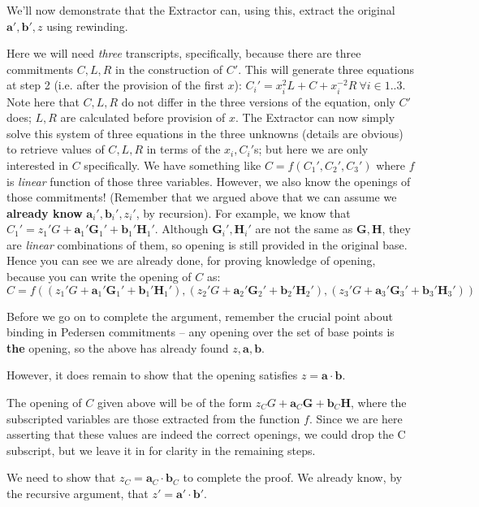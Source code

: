 \documentclass[10pt,a4paper]{article}
\begin{document}
We'll now demonstrate that the Extractor can, using this, extract the
original $\mathbf{a}', \mathbf{b}', z$ using rewinding.

Here we will need \emph{three} transcripts, specifically, because there
are three commitments $C, L, R$ in the construction of $C'$. This will generate three
equations at step 2 (i.e. after the provision of the first $x$):
$C_i' = x_i^2L + C + x_i^{-2}R\ \forall i \in 1..3$. Note here that $C, L, R$ do not differ in the three versions of the equation,
only $C'$ does; $L, R$ are calculated before provision of $x$. The Extractor can now
simply solve this system of three equations in the three unknowns
(details are obvious) to retrieve values of $C, L, R$ in terms of the $x_i,C_i'$s; but here
we are only interested in $C$ specifically. We have something like $C = f(C_1', C_2', C_3')$ where $f$ is
\emph{linear} function of those three variables. However, we also know
the openings of those commitments! (Remember that we argued above that
we can assume we \textbf{already know} $\textbf{a}_i', \textbf{b}_i', z_i'$, by recursion). For example, we
know that $C_1' = z_1'G + \textbf{a}_1'\textbf{G}_1' + \textbf{b}_1'\textbf{H}_1'$. Although $\textbf{G}_i',\textbf{H}_i'$ are not the same as $\mathbf{G}, \mathbf{H}$, they are \emph{linear
}combinations of them, so opening is still provided in the original
base. Hence you can see we are already done, for proving knowledge of
opening, because you can write the opening of $C$ as:
\[C = f((z_1'G + \textbf{a}_1'\textbf{G}_1'+ \textbf{b}_1'\textbf{H}_1'), (z_2'G + \textbf{a}_2'\textbf{G}_2'+ \textbf{b}_2'\textbf{H}_2'), (z_3'G + \textbf{a}_3'\textbf{G}_3'+ \textbf{b}_3'\textbf{H}_3'))\]

Before we go on to complete the argument, remember the crucial point
about binding in Pedersen commitments -- any opening over the set of
base points is \textbf{the} opening, so the above has already found $z, \mathbf{a}, \mathbf{b}$.

However, it does remain to show that the opening satisfies $z = \mathbf{a}\cdot\mathbf{b}$.

The opening of $C$ given above will be of the form $z_C G + \textbf{a}_C \textbf{G} + \textbf{b}_C \textbf{H}$, where the subscripted
variables are those extracted from the function $f$. Since we are here
asserting that these values are indeed the correct openings, we could
drop the C subscript, but we leave it in for clarity in the remaining
steps.

We need to show that $z_C = \textbf{a}_C \cdot \textbf{b}_C$ to complete the proof. We already know, by the
recursive argument, that $z' = \textbf{a}' \cdot \textbf{b}'$.
\end{document}
